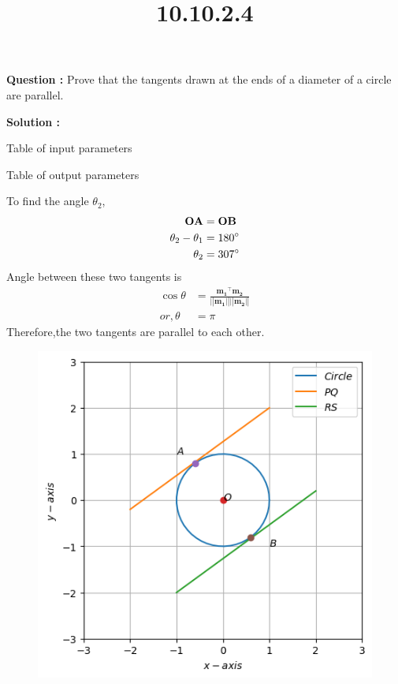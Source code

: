 \documentclass[12pt]{article}
\let\vec\mathbf
\providecommand{\norm}[1]{\ensuremath{\lvert|#1\rvert|}}
\begin{document}
\title{\textbf{10.10.2.4}}
\date{}
\maketitle
\textbf{Question :} Prove that the tangents drawn at the ends of a diameter of a circle are parallel.

\textbf{Solution :}
\begin{table}[H]
    \centering
    
    \caption{Table of input parameters}
    \label{tab:11.11.1.13.1}
\end{table}
\begin{table}[H]
    \centering
    
    \caption{Table of output parameters}
    \label{tab:11.11.1.13.2}
\end{table}
To find the angle $\theta_2$,
\begin{align}
    \vec{OA} &=\vec{OB}\\
    \theta_2- \theta_1&= 180\degree\\
    \theta_2 &= 307\degree
    \end{align}
Angle between these two tangents is
\begin{align}
    \cos{\theta}&=\frac{\vec{m_1}^{\top}\vec{m_2}}{\vec{\norm{m_1}\norm{m_2}}}\\
    or,\theta &= \pi
\end{align}
Therefore,the two tangents are parallel to each other.
\begin{figure}[H]                          
\centering                    
\includegraphics[width=\columnwidth]{fig/10.10.2.4.png}                      
\caption{}              
\label{10.10.2.4}
\end{figure}
\end{document}
